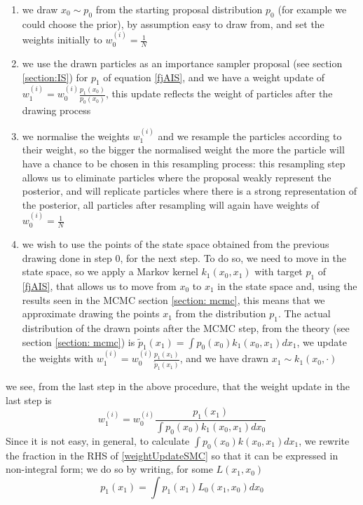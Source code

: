 \documentclass[12pt,mythesisstyle]{report}
\begin{document}
\begin{enumerate}\addtocounter{enumi}{-1}
	\item we draw $x_{0}\sim p_{0}$ from the starting proposal distribution $p_{0}$ (for example we could choose the prior), by assumption easy to draw from, and set the weights initially to $w^{(i)}_0=\frac{1}{N}$
	\item we use the drawn particles as an importance sampler proposal (see section \ref{section:IS}) for $p_1$ of equation \eqref{fjAIS}, and we have a weight update of $w^{(i)}_1=w^{(i)}_0\frac{p_1(x_0)}{p_0(x_0)}$, this update reflects the weight of particles after the drawing process
	\item we normalise the weights $w^{(i)}_1$ and we resample the particles according to their weight, so the bigger the normalised weight the more the particle will have a chance to be chosen in this resampling process: this resampling step allows us to eliminate particles where the proposal weakly represent the posterior, and will replicate particles where there is a strong representation of the posterior, all particles after resampling will again have weights of $w^{(i)}_0=\frac{1}{N}$
	\item we wish to use the points of the state space obtained from the previous drawing done in step 0, for the next step. To do so, we need to move in the state space, so we apply a Markov kernel $k_1(x_0,x_1)$ with target $p_1$ of \eqref{fjAIS}, that allows us to move from $x_0$ to $x_1$ in the state space and, using the results seen in the MCMC section \ref{section: mcmc}, this means that we approximate drawing the points $x_1$ from the distribution $p_1$. The actual distribution of the drawn points after the MCMC step, from the theory (see section \ref{section: mcmc}) is $\tilde{p}_1(x_1)=\int p_0(x_0)k_1(x_0,x_1)dx_1$, we update the weights with $w^{(i)}_1=w^{(i)}_0\frac{p_1(x_1)}{\tilde{p}_1(x_1)}$, and we have drawn $x_1 \sim k_1(x_0,\cdot)$
\end{enumerate}
we see, from the last step in the above procedure, that the weight update in the last step is
\begin{equation}\label{weightUpdateSMC}
w^{(i)}_1=w^{(i)}_0\frac{p_1(x_1)}{\int p_0(x_0)k_1(x_0,x_1)dx_0}
\end{equation}
Since it is not easy, in general, to calculate $\int p_0(x_0)k(x_0,x_1)dx_1$, we rewrite the fraction in the RHS of \eqref{weightUpdateSMC} so that it can be expressed in non-integral form; we do so by writing, for some $L(x_1,x_0)$
\begin{equation}\label{nonIntegralSMC}
p_1(x_1)=\int p_1(x_1)L_0(x_1,x_0)dx_0
\end{equation}
\end{document}
